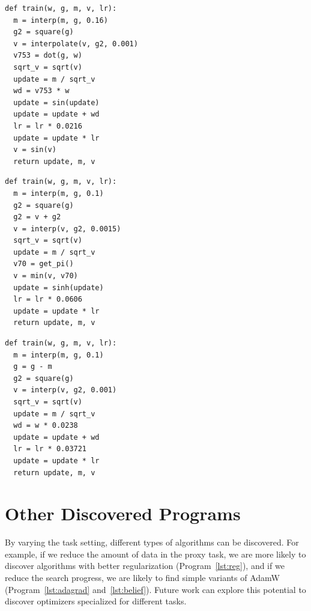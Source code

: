 \documentclass{article}
\begin{document}
\begin{minipage}[t]{.28\linewidth}
\begin{lstlisting}[caption={Algorithm with a better regularization. It dynamically calculates the dot product between the weight and gradient, before computing the weight decay.}, captionpos=t, label={lst:reg}]
def train(w, g, m, v, lr):
  m = interp(m, g, 0.16)
  g2 = square(g)
  v = interpolate(v, g2, 0.001)
  v753 = dot(g, w)
  sqrt_v = sqrt(v)
  update = m / sqrt_v
  wd = v753 * w
  update = sin(update)
  update = update + wd
  lr = lr * 0.0216
  update = update * lr
  v = sin(v)
  return update, m, v
\end{lstlisting}
\end{minipage}\hspace{50pt}%
\begin{minipage}[t]{.25\linewidth}
\begin{lstlisting}[caption={Algorithm that tracks the second moment without EMA decay, which is the same as AdaGrad.}, captionpos=t, label={lst:adagrad}]
def train(w, g, m, v, lr):
  m = interp(m, g, 0.1)
  g2 = square(g)
  g2 = v + g2
  v = interp(v, g2, 0.0015)
  sqrt_v = sqrt(v)
  update = m / sqrt_v
  v70 = get_pi()
  v = min(v, v70)
  update = sinh(update)
  lr = lr * 0.0606
  update = update * lr
  return update, m, v
\end{lstlisting}
\end{minipage}\hspace{50pt}%
\begin{minipage}[t]{.25\linewidth}
\begin{lstlisting}[caption={Algorithm uses the difference between gradient and momentum to track the second moment, resembling AdaBelief.}, captionpos=t, label={lst:belief}]
def train(w, g, m, v, lr):
  m = interp(m, g, 0.1)
  g = g - m
  g2 = square(g)
  v = interp(v, g2, 0.001)
  sqrt_v = sqrt(v)
  update = m / sqrt_v
  wd = w * 0.0238
  update = update + wd
  lr = lr * 0.03721
  update = update * lr
  return update, m, v
\end{lstlisting}
\end{minipage}





\section{Other Discovered Programs}
\label{sec:adaptation}
By varying the task setting, different types of algorithms can be discovered. For example, if we reduce the amount of data in the proxy task, we are more likely to discover algorithms with better regularization (Program~\ref{lst:reg}), and if we reduce the search progress, we are likely to find simple variants of AdamW (Program~\ref{lst:adagrad} and~\ref{lst:belief}). Future work can explore this potential to discover optimizers specialized for different tasks. 
\end{document}
